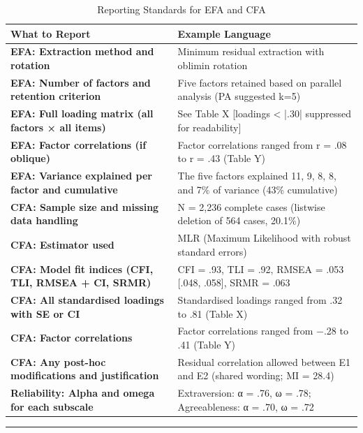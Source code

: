 \documentclass[
]{article}
\begin{document}
\begin{table}
\centering
\caption{\label{tab:reporting-template}Reporting Standards for EFA and CFA}
\centering
\begin{tabu} to 
\hline
What to Report & Example Language\\
\hline
\textbf{EFA: Extraction method and rotation} & Minimum residual extraction with oblimin rotation\\
\hline
\textbf{EFA: Number of factors and retention criterion} & Five factors retained based on parallel analysis (PA suggested k=5)\\
\hline
\textbf{EFA: Full loading matrix (all factors × all items)} & See Table X [loadings < |.30| suppressed for readability]\\
\hline
\textbf{EFA: Factor correlations (if oblique)} & Factor correlations ranged from r = .08 to r = .43 (Table Y)\\
\hline
\textbf{EFA: Variance explained per factor and cumulative} & The five factors explained 11, 9, 8, 8, and 7\% of variance (43\% cumulative)\\
\hline
\textbf{CFA: Sample size and missing data handling} & N = 2,236 complete cases (listwise deletion of 564 cases, 20.1\%)\\
\hline
\textbf{CFA: Estimator used} & MLR (Maximum Likelihood with robust standard errors)\\
\hline
\textbf{CFA: Model fit indices (CFI, TLI, RMSEA + CI, SRMR)} & CFI = .93, TLI = .92, RMSEA = .053 [.048, .058], SRMR = .063\\
\hline
\textbf{CFA: All standardised loadings with SE or CI} & Standardised loadings ranged from .32 to .81 (Table X)\\
\hline
\textbf{CFA: Factor correlations} & Factor correlations ranged from −.28 to .41 (Table Y)\\
\hline
\textbf{CFA: Any post-hoc modifications and justification} & Residual correlation allowed between E1 and E2 (shared wording; MI = 28.4)\\
\hline
\textbf{Reliability: Alpha and omega for each subscale} & Extraversion: α = .76, ω = .78; Agreeableness: α = .70, ω = .72\\
\hline
\end{tabu}
\end{table}

\begin{center}\rule{0.5\linewidth}{0.5pt}\end{center}
\end{document}
